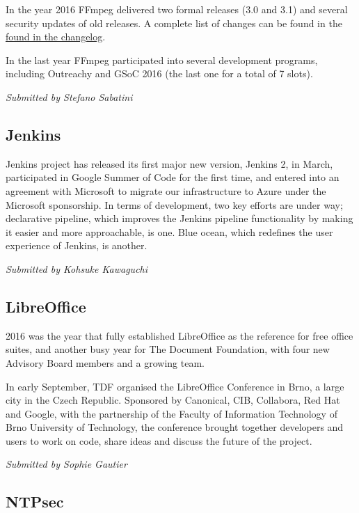 \documentclass[letterpaper]{report}
\begin{document}
In the year 2016 FFmpeg delivered two formal releases (3.0 and 3.1) and
several security updates of old releases. A complete list of changes can
be found in the
\href{http://git.videolan.org/?p=ffmpeg.git;a=blob_plain;f=Changelog;hb=HEAD}{found
in the changelog}.

In the last year FFmpeg participated into several development programs,
including Outreachy and GSoC 2016 (the last one for a total of 7 slots).

{\em Submitted by Stefano Sabatini}

\subsection{Jenkins}

Jenkins project has released its first major new version, Jenkins 2, in
March, participated in Google Summer of Code for the first time, and
entered into an agreement with Microsoft to migrate our infrastructure
to Azure under the Microsoft sponsorship. In terms of development, two
key efforts are under way; declarative pipeline, which improves the
Jenkins pipeline functionality by making it easier and more
approachable, is one.  Blue ocean, which redefines the user experience
of Jenkins, is another.

{\em Submitted by Kohsuke Kawaguchi}

\subsection{LibreOffice}

2016 was the year that fully established LibreOffice as the reference
for free office suites, and another busy year for The Document
Foundation, with four new Advisory Board members and a growing team.

In early September, TDF organised the LibreOffice Conference in Brno, a
large city in the Czech Republic. Sponsored by Canonical, CIB,
Collabora, Red Hat and Google, with the partnership of the Faculty of
Information Technology of Brno University of Technology, the conference
brought together developers and users to work on code, share ideas and
discuss the future of the project.

{\em Submitted by Sophie Gautier}

\subsection{NTPsec}
\end{document}
